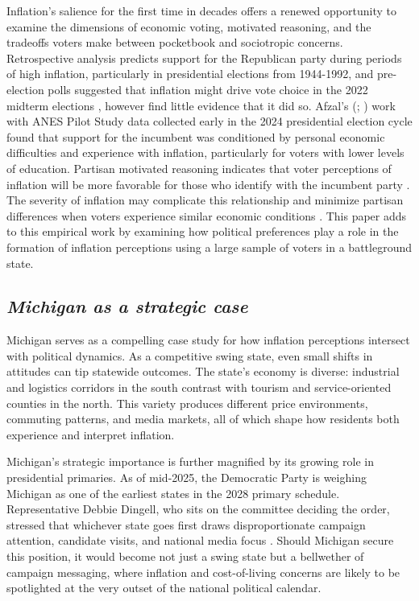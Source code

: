 \documentclass[]{interact}
\theoremstyle{plain}%
\theoremstyle{definition}
\theoremstyle{remark}
\begin{document}
Inflation’s salience for the first time in decades offers a renewed opportunity to examine the dimensions of economic voting, motivated reasoning, and the tradeoffs voters make between pocketbook and sociotropic concerns. Retrospective analysis \citep{verstyuk_partisan_2004} predicts support for the Republican party during periods of high inflation, particularly in presidential elections from 1944-1992, and pre-election polls suggested that inflation might drive vote choice in the 2022 midterm elections \citep{montanaro_poll_2022,safarpour_abortion_2022}, however \citet{mutz_inflation_2024} find little evidence that it did so. Afzal's (\citeyear{afzal_economic_2024}; \citeyear{afzal_economic_2024-1})
 work with ANES Pilot Study data collected early in the 2024 presidential election cycle found that support for the incumbent was conditioned by personal economic difficulties and experience with inflation, particularly for voters with lower levels of education. Partisan motivated reasoning indicates that voter perceptions of inflation will be more favorable for those who identify with the incumbent party \citep{bartels_beyond_2002, evans_political_2006,evans_reversing_2010,gerber_partisanship_2010,enns_consequences_2012,dickerson_conditional_2017,donovan_motivated_2020}. The severity of inflation may complicate this relationship \citep{dickerson_economic_2016} and minimize partisan differences when voters experience similar economic conditions \citep{parker-stephen_tides_2013,stanig_political_2013}. This paper adds to this empirical work by examining how political preferences play a role in the formation of inflation perceptions using a large sample of voters in a battleground state. 

\subsection*{\textit{Michigan as a strategic case}}

Michigan serves as a compelling case study for how inflation perceptions intersect with political dynamics. As a competitive swing state, even small shifts in attitudes can tip statewide outcomes. The state’s economy is diverse: industrial and logistics corridors in the south contrast with tourism and service-oriented counties in the north. This variety produces different price environments, commuting patterns, and media markets, all of which shape how residents both experience and interpret inflation.

Michigan’s strategic importance is further magnified by its growing role in presidential primaries. As of mid-2025, the Democratic Party is weighing Michigan as one of the earliest states in the 2028 primary schedule. Representative Debbie Dingell, who sits on the committee deciding the order, stressed that whichever state goes first draws disproportionate campaign attention, candidate visits, and national media focus \citep{klinefelterMichiganStatesVying2025}. Should Michigan secure this position, it would become not just a swing state but a bellwether of campaign messaging, where inflation and cost-of-living concerns are likely to be spotlighted at the very outset of the national political calendar.
\end{document}
